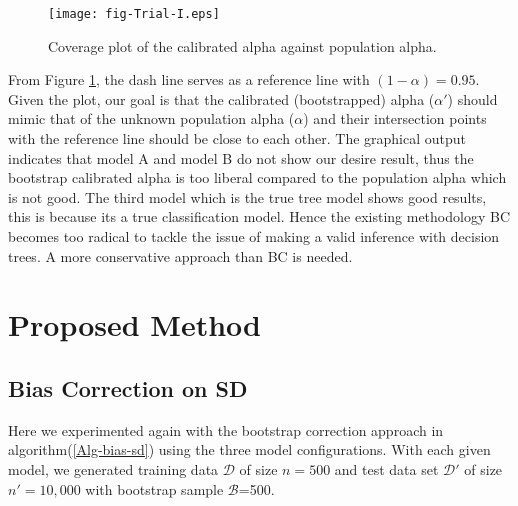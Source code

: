 \begin{figure}[H]
	\centering
	\texttt{[image: fig-Trial-I.eps]}
	\caption{Coverage plot of the calibrated alpha against population alpha.} 
		\label{fig-Trial-IBC}
\end{figure}
\vspace{0.1in}
From Figure \ref{fig-Trial-IBC}, the dash line serves as a reference line with $(1-\alpha)= 0.95$. Given the plot, our goal is that the calibrated (bootstrapped) alpha ($\alpha'$) should mimic that of the unknown population alpha ($\alpha$) and their intersection points with the reference line should be close to each other. The graphical output indicates that model A and model B do not show our desire result, thus the bootstrap calibrated alpha is too liberal compared to the population alpha which is not good. The third model which is the true tree model shows good results, this is because its a true classification model. Hence the existing methodology BC becomes too radical to tackle the issue of making a valid inference with decision trees. A more conservative approach than BC is needed.



\section{Proposed Method }
\subsection{ Bias Correction on SD}
Here we experimented again with the bootstrap correction approach in algorithm(\ref{Alg-bias-sd}) using the three model configurations. With each given model, we generated training data $\mathcal{D}$ of size $n=500$ and test data set $\mathcal{D}'$ of size $n'=10,000$ with bootstrap sample $\mathcal{B}$=500. %

